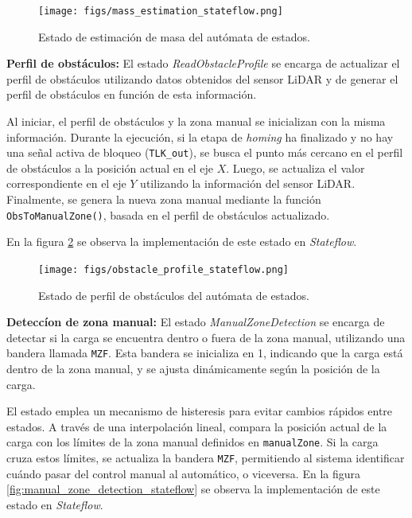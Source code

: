 \documentclass{article}
\begin{document}
            \begin{figure} [H]
                \centering
                \texttt{[image: figs/mass\_estimation\_stateflow.png]}
                \caption{Estado de estimación de masa del autómata de estados.}
                \label{fig:mass_estimation_stateflow}
            \end{figure}

        \textbf{Perfil de obstáculos:}
            El estado \textit{ReadObstacleProfile} se encarga de actualizar el perfil de obstáculos utilizando datos obtenidos del sensor LiDAR y de generar el perfil de obstáculos en función de esta información. 

            Al iniciar, el perfil de obstáculos y la zona manual se inicializan con la misma información. Durante la ejecución, si la etapa de \textit{homing} ha finalizado y no hay una señal activa de bloqueo (\texttt{TLK\_out}), se busca el punto más cercano en el perfil de obstáculos a la posición actual en el eje \(X\). Luego, se actualiza el valor correspondiente en el eje \(Y\) utilizando la información del sensor LiDAR. Finalmente, se genera la nueva zona manual mediante la función \texttt{ObsToManualZone()}, basada en el perfil de obstáculos actualizado.

            En la figura \ref{fig:obstacle_profile_stateflow} se observa la implementación de este estado en \textit{Stateflow}.

            \begin{figure} [H]
                \centering
                \texttt{[image: figs/obstacle\_profile\_stateflow.png]}
                \caption{Estado de perfil de obstáculos del autómata de estados.}
                \label{fig:obstacle_profile_stateflow}
            \end{figure}

        \textbf{Deteccíon de zona manual:}
            El estado \textit{ManualZoneDetection} se encarga de detectar si la carga se encuentra dentro o fuera de la zona manual, utilizando una bandera llamada \texttt{MZF}. Esta bandera se inicializa en 1, indicando que la carga está dentro de la zona manual, y se ajusta dinámicamente según la posición de la carga.

            El estado emplea un mecanismo de histeresis para evitar cambios rápidos entre estados. A través de una interpolación lineal, compara la posición actual de la carga con los límites de la zona manual definidos en \texttt{manualZone}. Si la carga cruza estos límites, se actualiza la bandera \texttt{MZF}, permitiendo al sistema identificar cuándo pasar del control manual al automático, o viceversa. En la figura \ref{fig:manual_zone_detection_stateflow} se observa la implementación de este estado en \textit{Stateflow}.
        
\end{document}
